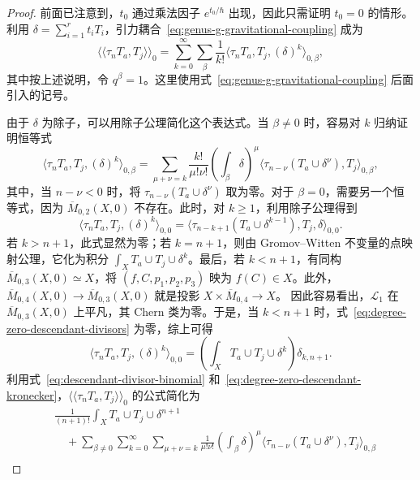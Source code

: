 \begin{proof}
前面已注意到，$t_0$ 通过乘法因子 $e^{t_0/\hbar}$ 出现，因此只需证明 $t_0=0$ 的情形。利用 $\delta=\sum_{i=1}^rt_iT_i$，引力耦合~\eqref{eq:genus-g-gravitational-coupling} 成为
\[
\langle\!\langle\tau_nT_a,T_j\rangle\!\rangle_0
=\sum_{k=0}^{\infty}\sum_\beta\frac1{k!}
\langle\tau_nT_a,T_j,(\delta)^k\rangle_{0,\beta},
\]
其中按上述说明，令 $q^\beta=1$。这里使用式~\eqref{eq:genus-g-gravitational-coupling} 后面引入的记号。

由于 $\delta$ 为除子，可以用除子公理简化这个表达式。当 $\beta\ne0$ 时，容易对 $k$ 归纳证明恒等式
\begin{equation}\label{eq:descendant-divisor-binomial}
\langle\tau_nT_a,T_j,(\delta)^k\rangle_{0,\beta}
=\sum_{\mu+\nu=k}\frac{k!}{\mu!\nu!}
\left(\int_\beta\delta\right)^\mu
\langle\tau_{n-\nu}(T_a\cup\delta^\nu),T_j\rangle_{0,\beta},
\end{equation}
其中，当 $n-\nu<0$ 时，将 $\tau_{n-\nu}(T_a\cup\delta^\nu)$ 取为零。对于 $\beta=0$，需要另一个恒等式，因为 $\overline M_{0,2}(X,0)$ 不存在。此时，对 $k\ge1$，利用除子公理得到
\begin{equation}\label{eq:degree-zero-descendant-divisors}
\langle\tau_nT_a,T_j,(\delta)^k\rangle_{0,0}
=\langle\tau_{n-k+1}(T_a\cup\delta^{k-1}),T_j,\delta\rangle_{0,0}.
\end{equation}
若 $k>n+1$，此式显然为零；若 $k=n+1$，则由 Gromov--Witten 不变量的点映射公理，它化为积分 $\int_XT_a\cup T_j\cup\delta^k$。最后，若 $k<n+1$，有同构 $\overline M_{0,3}(X,0)\simeq X$，将 $(f,C,p_1,p_2,p_3)$ 映为 $f(C)\in X$。此外，$\overline M_{0,4}(X,0)\to\overline M_{0,3}(X,0)$ 就是投影 $X\times\overline M_{0,4}\to X$。
因此容易看出，$\mathcal L_1$ 在 $\overline M_{0,3}(X,0)$ 上平凡，其 Chern 类为零。于是，当 $k<n+1$ 时，式~\eqref{eq:degree-zero-descendant-divisors} 为零，综上可得
\begin{equation}\label{eq:degree-zero-descendant-kronecker}
\langle\tau_nT_a,T_j,(\delta)^k\rangle_{0,0}
=\left(\int_XT_a\cup T_j\cup\delta^k\right)\delta_{k,n+1}.
\end{equation}
利用式~\eqref{eq:descendant-divisor-binomial} 和~\eqref{eq:degree-zero-descendant-kronecker}，$\langle\!\langle\tau_nT_a,T_j\rangle\!\rangle_0$ 的公式简化为
\[
\begin{aligned}
&\frac1{(n+1)!}\int_XT_a\cup T_j\cup\delta^{n+1}\\
&\quad+\sum_{\beta\ne0}\sum_{k=0}^{\infty}\sum_{\mu+\nu=k}
\frac1{\mu!\nu!}\left(\int_\beta\delta\right)^\mu
\langle\tau_{n-\nu}(T_a\cup\delta^\nu),T_j\rangle_{0,\beta}\\

\end{aligned}\]
\end{proof}
